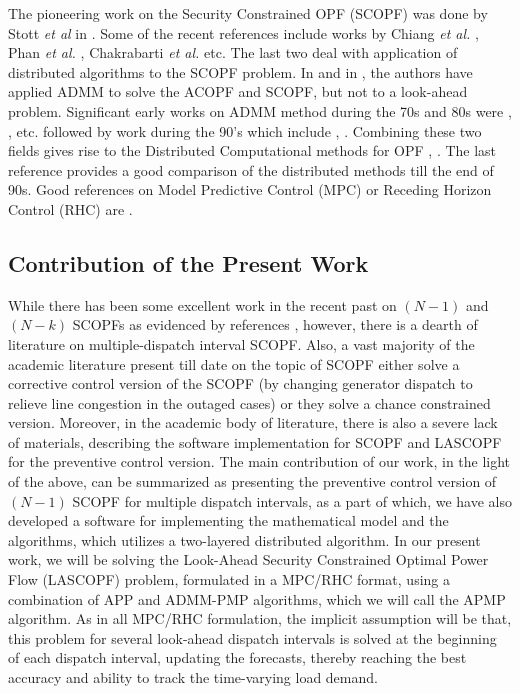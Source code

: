 \documentclass[preprint,12pt,3p]{elsarticle}
\begin{document}
The pioneering work on the Security Constrained OPF (SCOPF) was done by Stott \emph{et al} in \cite{1458198}. Some of the recent references include works by Chiang \emph{et al.} \cite{CG:11}, Phan \emph{et al.} \cite{PK:12}, Chakrabarti \emph{et al.} \cite{CK:14} etc. The last two deal with application of distributed algorithms to the SCOPF problem. In \cite{E:14} and in \cite{LKWZ:13}, the authors have applied ADMM to solve the ACOPF and SCOPF, but not to a look-ahead problem. Significant early works on ADMM method during the 70s and 80s were \cite{GlM:75}, \cite{Gab:83}, \cite{FG:83} etc. followed by work during the 90's which include \cite{EF:93}, \cite{Eck:94b}. Combining these two fields gives rise to the Distributed Computational methods for OPF \cite{KB:97}, \cite{KB:00}. The last reference provides a good comparison of the distributed methods till the end of 90s. Good references on Model Predictive Control (MPC) or Receding Horizon Control (RHC) are \cite{QB:03,CTHK:03,Her:05,TR:04,KW:11}. \subsection{Contribution of the Present Work}While there has been some excellent work in the recent past on $(N-1)$ and $(N-k)$ SCOPFs as evidenced by references \cite{capitanescu2011state, lubin2015robust, amjady2011security, la1998line, articleSCOPF}, however, there is a dearth of literature on multiple-dispatch interval SCOPF. Also, a vast majority of the academic literature present till date on the topic of SCOPF either solve a corrective control version of the SCOPF (by changing generator dispatch to relieve line congestion in the outaged cases) or they solve a chance constrained version. Moreover, in the academic body of literature, there is also a severe lack of materials, describing the software implementation for SCOPF and LASCOPF for the preventive control version. The main contribution of our work, in the light of the above, can be summarized as presenting the preventive control version of $(N-1)$ SCOPF for multiple dispatch intervals, as a part of which, we have also developed a software for implementing the mathematical model and the algorithms, which utilizes a two-layered distributed algorithm. In our present work, we will be solving the Look-Ahead Security Constrained Optimal Power Flow (LASCOPF) problem, formulated in a MPC/RHC format, using a combination of APP and ADMM-PMP algorithms, which we will call the APMP algorithm. As in all MPC/RHC formulation, the implicit assumption will be that, this problem for several look-ahead dispatch intervals is solved at the beginning of each dispatch interval, updating the forecasts, thereby reaching the best accuracy and ability to track the time-varying load demand.
\end{document}
